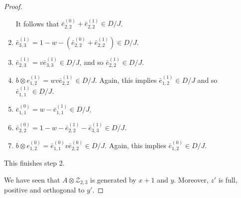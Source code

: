 \documentclass{amsart}
\theoremstyle{definition}
\begin{document}
\begin{proof}
\begin{enumerate}[1.  ]
        It follows that $\bar{e}_{2,2}^{(0)} + \bar{e}_{2,2}^{(1)}\in D/J$.
        \item
        $\bar{e}_{3,3}^{(1)}=1-w-(\bar{e}_{2,2}^{(0)} + \bar{e}_{2,2}^{(1)})\in D/J$.
        \item
        $\bar{e}_{2,3}^{(1)}= v \bar{e}_{3,3}^{(1)}\in D/J$, and so $\bar{e}_{2,2}^{(1)}\in D/J$.
        \item
        $b\otimes e_{1,2}^{(1)}=wv\bar{e}_{2,2}^{(1)}\in D/J$.
        Again, this implies $\bar{e}_{1,2}^{(1)}\in D/J$ and so $\bar{e}_{1,1}^{(1)}\in D/J$.
        \item
        $\bar{e}_{1,1}^{(0)}=w-\bar{e}_{1,1}^{(1)}\in D/J$.
        \item
        $\bar{e}_{2,2}^{(0)}=1-w-\bar{e}_{2,2}^{(1)}-\bar{e}_{3,3}^{(1)}\in D/J$.
        \item
        $b\otimes e_{1,2}^{(0)}=\bar{e}_{1,1}^{(0)}v\bar{e}_{2,2}^{(0)}\in D/J$.
        Again, this implies $\bar{e}_{1,2}^{(0)}\in D/J$.
    \end{enumerate}
    This finishes step 2.

    We have seen that $A\otimes\mathcal{Z}_{2,3}$ is generated by $x+1$ and $y$.
    Moreover, $z'$ is full, positive and orthogonal to $y'$.
\end{proof}
\end{document}
